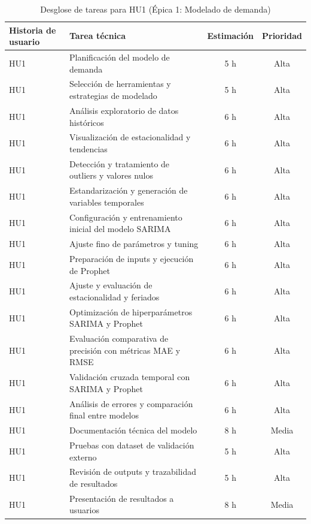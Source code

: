 \documentclass[
11pt, %
]{charter}
\begin{document}
\begin{table}[H]
\centering
\begin{tabular}{|l|p{6cm}|c|c|}
\hline
\textbf{Historia de usuario} & \textbf{Tarea técnica} & \textbf{Estimación} & \textbf{Prioridad} \\
\hline
HU1 & Planificación del modelo de demanda & 5 h & Alta \\
HU1 & Selección de herramientas y estrategias de modelado & 5 h & Alta \\
HU1 & Análisis exploratorio de datos históricos & 6 h & Alta \\
HU1 & Visualización de estacionalidad y tendencias & 6 h & Alta \\
HU1 & Detección y tratamiento de outliers y valores nulos & 6 h & Alta \\
HU1 & Estandarización y generación de variables temporales & 6 h & Alta \\
HU1 & Configuración y entrenamiento inicial del modelo SARIMA & 6 h & Alta \\
HU1 & Ajuste fino de parámetros y tuning & 6 h & Alta \\
HU1 & Preparación de inputs y ejecución de Prophet & 6 h & Alta \\
HU1 & Ajuste y evaluación de estacionalidad y feriados & 6 h & Alta \\
HU1 & Optimización de hiperparámetros SARIMA y Prophet & 6 h & Alta \\
HU1 & Evaluación comparativa de precisión con métricas MAE y RMSE & 6 h & Alta \\
HU1 & Validación cruzada temporal con SARIMA y Prophet & 6 h & Alta \\
HU1 & Análisis de errores y comparación final entre modelos & 6 h & Alta \\
HU1 & Documentación técnica del modelo & 8 h & Media \\
HU1 & Pruebas con dataset de validación externo & 5 h & Alta \\
HU1 & Revisión de outputs y trazabilidad de resultados & 5 h & Alta \\
HU1 & Presentación de resultados a usuarios & 8 h & Media \\
\hline
\end{tabular}
\caption{Desglose de tareas para HU1 (Épica 1: Modelado de demanda)}
\end{table}
\end{document}
